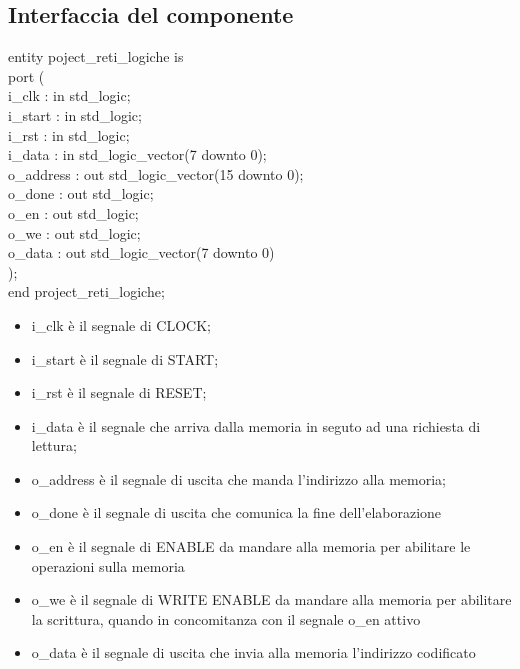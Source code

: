 \documentclass{article}
\newcommand\tab[1][1cm]{\hspace*{#1}}
\begin{document}
\subsection{Interfaccia del componente}
{\selectfont
entity poject\_reti\_logiche is\\
\tab port (\\
\tab\tab i\_clk\hspace*{1,5cm} : in std\_logic;\\
\tab\tab i\_start\hspace*{1,1cm} : in std\_logic;\\
\tab\tab i\_rst\hspace*{1,5cm} : in std\_logic;\\
\tab\tab i\_data\hspace*{1,3cm} : in std\_logic\_vector(7 downto 0);\\
\tab\tab o\_address\hspace*{0,7cm} : out std\_logic\_vector(15 downto 0);\\
\tab\tab o\_done\hspace*{1,3cm} : out std\_logic;\\
\tab\tab o\_en\hspace*{1,7cm} : out std\_logic;\\
\tab\tab o\_we\hspace*{1,7cm} : out std\_logic;\\
\tab\tab o\_data\hspace*{1,3cm} : out std\_logic\_vector(7 downto 0)\\
\tab );\\
end project\_reti\_logiche;
}
\begin{itemize}
\vspace{5mm} %
\item i\_clk è il segnale di CLOCK;
\item i\_start è il segnale di START;
\item i\_rst è il segnale di RESET;
\item i\_data è il segnale che arriva dalla memoria in seguto ad una richiesta di lettura;
\item o\_address è il segnale di uscita che manda l'indirizzo alla memoria;
\item o\_done è il segnale di uscita che comunica la fine dell'elaborazione
\item o\_en è il segnale di ENABLE da mandare alla memoria per abilitare le operazioni sulla memoria
\item o\_we è il segnale di WRITE ENABLE da mandare alla memoria per abilitare la scrittura, quando in concomitanza con il segnale o\_en attivo
\item o\_data è il segnale di uscita che invia alla memoria l'indirizzo codificato
\end{itemize}
\pagebreak
\end{document}
